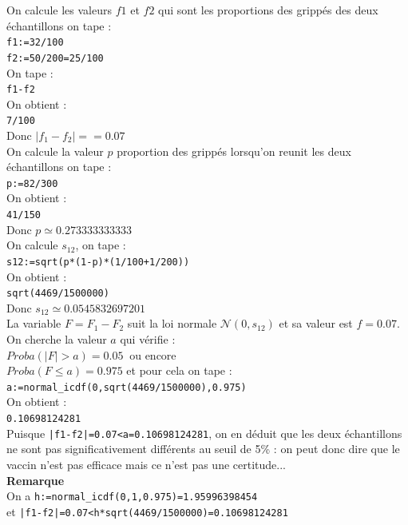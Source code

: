 \documentclass[a4paper,11pt]{book}
\begin{document}
On calcule les valeurs $f1$ et $f2$ qui sont les proportions des gripp\'es 
des deux \'echantillons on tape :\\
{\tt f1:=32/100}\\
{\tt f2:=50/200=25/100}\\
On tape :\\
 {\tt f1-f2}\\
On obtient  :\\
{\tt 7/100}\\
Donc $|f_1-f_2|==0.07$\\
On calcule la valeur $p$ proportion des gripp\'es lorsqu'on reunit les deux 
\'echantillons on tape :\\
{\tt p:=82/300}\\
On obtient :\\
{\tt 41/150}\\
Donc $p\simeq 0.273333333333$\\
On calcule $s_{12}$, on tape :\\
{\tt s12:=sqrt(p*(1-p)*(1/100+1/200))}\\
On obtient :\\
{\tt sqrt(4469/1500000)}\\
Donc $s_{12} \simeq 0.0545832697201$\\
La variable $F=F_1-F_2$ suit la loi normale $\mathcal N(0,s_{12})$ et
sa valeur est $f=0.07$.\\ 
On cherche la valeur $a$ qui v\'erifie :\\
$Proba(|F|>a)=0.05\ $ ou encore \\
$Proba(F\leq a)=0.975$ et
 pour cela on tape :\\
{\tt a:=normal\_icdf(0,sqrt(4469/1500000),0.975)} \\
On obtient :\\
{\tt 0.10698124281}\\
Puisque {\tt |f1-f2|=0.07<a=0.10698124281}, on en d\'eduit que les deux 
\'echantillons ne sont pas significativement diff\'erents au seuil de 5\% : 
on peut donc 
dire que le vaccin n'est pas efficace mais ce n'est pas une certitude...\\
{\bf Remarque}\\
On a {\tt h:=normal\_icdf(0,1,0.975)=1.95996398454} \\
et {\tt |f1-f2|=0.07<h*sqrt(4469/1500000)=0.10698124281}
\end{document}
